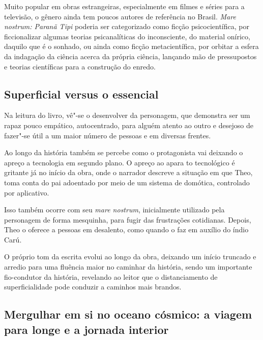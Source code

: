 \documentclass[12pt]{extarticle}
\begin{document}
Muito popular em obras estrangeiras, especialmente em filmes e séries para a
televisão, o gênero ainda tem poucos autores de referência no Brasil.
\textit{Mare nostrum: Paranã Tipi} poderia ser categorizado como ficção
psicocientífica, por ficcionalizar algumas teorias psicanalíticas do
inconsciente, do material onírico, daquilo que é o sonhado, ou ainda como
ficção metacientífica, por orbitar a esfera da indagação da ciência acerca da
própria ciência, lançando mão de pressupostos e teorias científicas para a
construção do enredo.






\subsection{Superficial versus o essencial}

Na leitura do livro, vê"-se o desenvolver da personagem, que demonstra
ser um rapaz pouco empático, autocentrado, para alguém atento ao outro e
desejoso de fazer"-se útil a um maior número de pessoas e em
diversas frentes.

Ao longo da história também se percebe como o protagonista vai deixando
o apreço a tecnologia em segundo plano. O apreço ao apara to tecnológico é
gritante já no início da obra, onde o narrador descreve a situação em que
Theo, toma conta do pai adoentado por meio de um
sistema de domótica, controlado por aplicativo.

Isso também ocorre com seu \emph{mare nostrum}, inicialmente utilizado
pela personagem de forma mesquinha, para fugir das frustrações
cotidianas. Depois, Theo o oferece a pessoas em desalento, como quando o
faz em auxílio do índio Carú.

O próprio tom da escrita evolui ao longo da obra, deixando um início
truncado e arredio para uma fluência maior no caminhar da
história, sendo um importante fio-condutor da história, revelando
ao leitor que o distanciamento de superficialidade pode conduzir a
caminhos mais brandos.


\subsection{Mergulhar em si no oceano cósmico: a viagem para longe e a
jornada interior}
\end{document}
